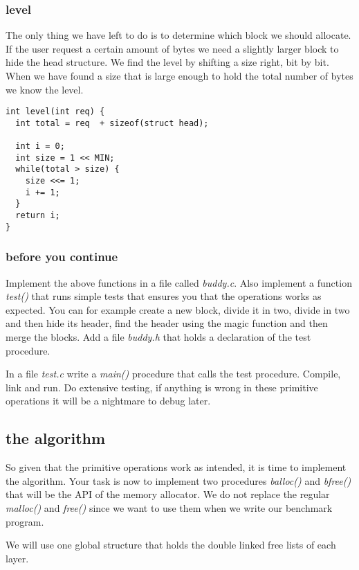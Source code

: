 \documentclass[a4paper,11pt]{article}
\begin{document}
\subsubsection*{level}

The only thing we have left to do is to determine which block we
should allocate. If the user request a certain amount of bytes we need
a slightly larger block to hide the head structure. We find the level
by shifting a size right, bit by bit. When we have found a size that
is large enough to hold the total number of bytes we know the level.

\begin{lstlisting}
int level(int req) {
  int total = req  + sizeof(struct head);

  int i = 0;
  int size = 1 << MIN;
  while(total > size) {
    size <<= 1;
    i += 1;
  }
  return i;
}
\end{lstlisting}

\subsubsection{before you continue}

Implement the above functions in a file called {\em buddy.c}. Also
implement a function {\em test()} that runs simple tests that ensures
you that the operations works as expected. You can for example create
a new block, divide it in two, divide in two and then hide its header,
find the header using the magic function and then merge the
blocks. Add a file {\em buddy.h} that holds a declaration of the test
procedure.

In a file {\em test.c} write a {\em main()} procedure that calls the
test procedure. Compile, link and run. Do extensive testing, if
anything is wrong in these primitive operations it will be a nightmare
to debug later.


\subsection{the algorithm}

So given that the primitive operations work as intended, it is time to implement
the algorithm. Your task is now to implement two procedures {\em
  balloc()} and {\em bfree()} that will be the API of the memory
allocator. We do not replace the regular {\em malloc()} and {\em free()}
since we want to use them when we write our benchmark program.

We will use one global structure that holds the double linked free
lists of each layer.
\end{document}
